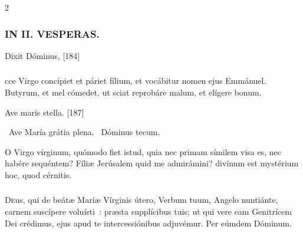 \documentclass[9pt,twoside]{extarticle}
\begin{document}
\begin{multicols}{2}
{{\subsubsection*{\center \textsc{IN II. VESPERAS.}}
\begin{tightlist}{}
\item {}
\item {} Dixit Dóminus,  [184]
\end{tightlist}

\subsubsection*{}
cce Virgo concípiet et páriet fílium, et vocábitur nomen ejus Emmánuel. Butyrum, et mel cómedet, ut sciat reprobáre malum, et elígere bonum.

\begin{tightlist}{}
\item {} Ave maris stella. [187]
\item {}~Ave María grátia plena. ~Dóminus tecum.

\item {} O Virgo vírginum, quómodo fiet istud, quia nec primam símilem visa es, nec habére sequéntem? Fíliæ Jerúsalem quid me admirámini? divínum est mystérium hoc, quod cérnitis.
\end{tightlist}

\subsubsection*{\center {}}
\lettrine{D}eus, qui de beátæ Maríæ Vírginis útero, Verbum tuum, Angelo nuntiánte, carnem suscípere voluísti~: præsta supplícibus tuis; ut qui vere eam Genitrícem Dei crédimus, ejus apud te intercessiónibus adjuvémur. Per eúmdem Dóminum.

}}
\end{multicols}
\end{document}
